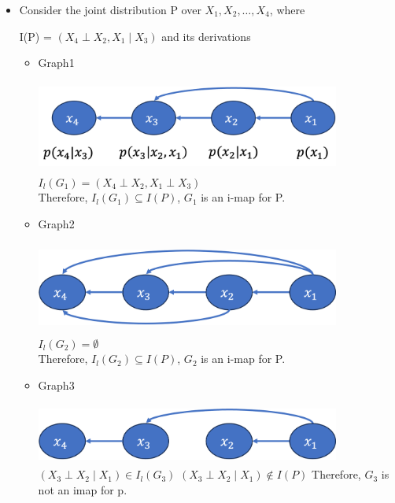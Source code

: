 \documentclass[11pt,a4paper]{report}
\begin{document}
\begin{itemize}
    \item Consider the joint distribution P over $X_{1}, X_{2}, \ldots, X_{4}$, where
    \begin{center}
        I(P) =  {$(X_{4} \perp X_{2}, X_{1} \mid X_{3})$ and its derivations}
    \end{center}
    \begin{itemize}
        \item Graph1
        
        \includegraphics[width = 10cm, height = 3cm]{graph_vis.png}\\
        $I_{l}(G_{1}) = {(X_{4} \perp X_{2}, X_{1} \perp X_{3})}$\\
        Therefore, $I_{l}(G_{1}) \subseteq I(P)$, $G_{1}$ is an i-map for P.

        \item Graph2
        
        \includegraphics[width = 10cm, height = 3cm]{graph_vis2.png}\\
        $I_{l}(G_{2}) = \emptyset $\\
        Therefore, $I_{l}(G_{2}) \subseteq I(P)$, $G_{2}$ is an i-map for P.

        \item Graph3
        
        \includegraphics[width = 10cm, height = 2cm]{imap_1.png}\\
        $(X_{3} \perp X_{2} \mid X_{1}) \in I_{l}(G_{3})$
        $(X_{3} \perp X_{2} \mid X_{1}) \notin I(P)$
        Therefore, $G_{3}$ is not an imap for p.
\end{itemize}


\end{itemize}
\end{document}
